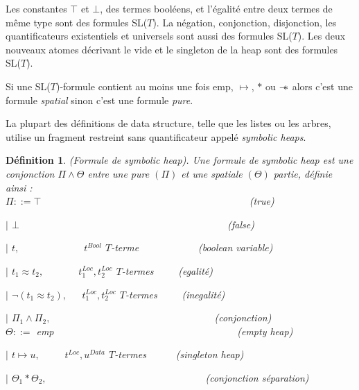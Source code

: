 \documentclass[11pt,openany]{article}
\newcommand\sepimp{\mathrel{-\mkern-6mu*}}
\newtheorem{definition}{D\'efinition}[subsection]
\begin{document}
	Les constantes $\top$ et $\bot$, des termes bool\'eens, et l'\'egalit\'e entre deux termes de m\^eme type sont des formules SL($T$). La n\'egation, conjonction, disjonction, les quantificateurs existentiels et universels sont aussi des formules SL($T$).
	Les deux nouveaux atomes d\'ecrivant le vide et le singleton de la heap sont des formules SL($T$).\par
	Si une SL($T$)-formule contient au moins une fois emp, $\mapsto$, $*$ ou $\sepimp$ alors c'est une formule \textit{spatial} sinon c'est une formule \textit{pure}.\par
	La plupart des d\'efinitions de data structure, telle que les listes ou les arbres, utilise un fragment restreint sans quantificateur appel\'e \textit{symbolic heaps}.
\begin{definition}
(Formule de symbolic heap). Une formule de \textit{symbolic heap} est une conjonction $\Pi\land\Theta$ entre une pure $(\Pi)$ et une spatiale $(\Theta)$ partie, d\'efinie ainsi :\\
$\Pi ::= \top$~~~~~~~~~~~~~~~~~~~~~~~~~~~~~~~~~~~~~~~~~~(true)\par
$|$ $\bot$~~~~~~~~~~~~~~~~~~~~~~~~~~~~~~~~~~~~~~~~~~(false)\par
$|$ $t,$~~~~~~~~~~~~~$t^{Bool}$ $T$-terme~~~~~~~~~~~~(boolean variable)\par
$|$ $t_{1}\approx t_{2},$~~~~~~~$t^{Loc}_{1},t^{Loc}_{2}$ $T$-termes~~~~~(egalit\'e)\par
$|$ $\neg(t_{1}\approx t_{2}),$~~~$t^{Loc}_{1},t^{Loc}_{2}$ $T$-termes~~~~~(inegalit\'e)\par
$|$ $\Pi_{1}\land\Pi_{2},$~~~~~~~~~~~~~~~~~~~~~~~~~~~~~~~~~(conjonction)\\
$\Theta ::=$ emp~~~~~~~~~~~~~~~~~~~~~~~~~~~~~~~~~~~~~(empty heap)\par
$|$ $t\mapsto u,$~~~~~$t^{Loc},u^{Data}$ $T$-termes~~~~~~(singleton heap)\par
$|$ $\Theta_{1}*\Theta_{2},$~~~~~~~~~~~~~~~~~~~~~~~~~~~~~~~~(conjonction s\'eparation)
\end{definition}
\end{document}
